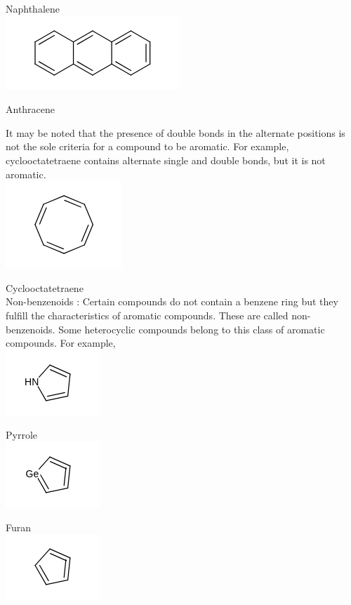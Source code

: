 \documentclass[10pt]{article}
\begin{document}
Naphthalene\\
\includegraphics{smile-842c25b0deae47018b3006d44fd8657f54b90ff6}

Anthracene

It may be noted that the presence of double bonds in the alternate positions is not the sole criteria for a compound to be aromatic. For example, cyclooctatetraene contains alternate single and double bonds, but it is not aromatic.\\
\includegraphics{smile-3244b09008ce21873656fbe3321008fdda59f74d}

Cyclooctatetraene\\
Non-benzenoids : Certain compounds do not contain a benzene ring but they fulfill the characteristics of aromatic compounds. These are called non-benzenoids. Some heterocyclic compounds belong to this class of aromatic compounds. For example,\\
\includegraphics{smile-f75570633182e37535f3520f0b1c7834dce90ba8}

Pyrrole\\
\includegraphics{smile-68906822b6b006a820384699f7dfdd3270260166}

Furan\\
\includegraphics{smile-1193b1bc38766c67d706b1bc96331b96abba7b8a}
\end{document}
